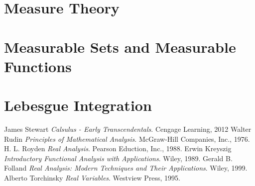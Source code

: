 \documentclass{article}
\begin{document}
\section{Measure Theory}

\section{Measurable Sets and Measurable Functions}

\section{Lebesgue Integration}

\begin{thebibliography}{100} %
 James Stewart {\em{Calsulus - Early Transcendentals}}. Cengage Learning, 2012
 Walter Rudin {\em{Principles of Mathematical Analysis}}. McGraw-Hill Companies, Inc., 1976.
 H. L. Royden {\em{Real Analysis}}. Pearson Eduction, Inc., 1988.
 Erwin Kreyszig {\em{Introductory Functional Analysis with Applications}}. Wiley, 1989.
 Gerald B. Folland {\em{Real Analysis: Modern Techniques and Their Applications}}. Wiley, 1999.
 Alberto Torchinsky {\em{Real Variables}}. Westview Press, 1995.
\end{thebibliography}
\end{document}

